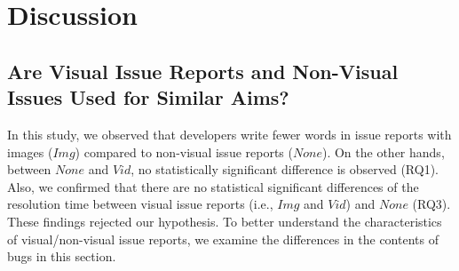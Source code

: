 \section{Discussion}



\subsection{Are Visual Issue Reports and Non-Visual Issues Used for Similar Aims?}
In this study, we observed that developers write fewer words in issue reports with images ($Img$) compared to non-visual issue reports ($None$). On the other hands, between $None$ and $Vid$, no statistically significant difference is observed (RQ1). 
Also, we confirmed that there are no statistical significant differences of the resolution time between visual issue reports (i.e., $Img$ and $Vid$) and $None$ (RQ3). These findings rejected our hypothesis. 
To better understand the characteristics of visual/non-visual issue reports, we examine the differences in the contents of bugs in this section.

